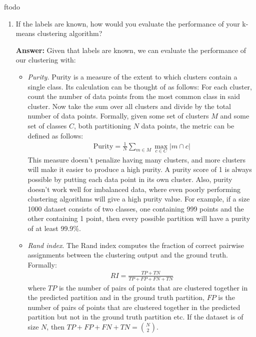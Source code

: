 ƒtodo\documentclass{article}
\newenvironment{QandA}{\begin{enumerate}[label=\arabic*.]}{\end{enumerate}}
\newenvironment{InnerQandA}{\begin{enumerate}[label=\roman*.]}{\end{enumerate}}
\newenvironment{answer}{\par\normalfont \textbf{Answer:}}{}
\begin{document}
\begin{QandA}
\begin{InnerQandA}
        \item If the labels are known, how would you evaluate the performance of your k-means clustering algorithm?
        \begin{answer}
            Given that labels are known, we can evaluate the performance of our clustering with:
            \begin{itemize}
                \item \textit{Purity.} Purity is a measure of the extent to which clusters contain a single class. Its calculation can be thought of as follows: For each cluster, count the number of data points from the most common class in said cluster. Now take the sum over all clusters and divide by the total number of data points. Formally, given some set of clusters $M$ and some set of classes $C$, both partitioning $N$ data points, the metric can be defined as follows:
                \begin{align*}
                    \text{Purity} = \frac{1}{N} \sum_{m \in M} \max_{c \in C} \vert m \cap c \vert
                \end{align*}
                This measure doesn't penalize having many clusters, and more clusters will make it easier to produce a high purity. A purity score of 1 is always possible by putting each data point in its own cluster. Also, purity doesn't work well for imbalanced data, where even poorly performing clustering algorithms will give a high purity value. For example, if a size 1000 dataset consists of two classes, one containing 999 points and the other containing 1 point, then every possible partition will have a purity of at least 99.9\%.
                \item \textit{Rand index}. The Rand index  computes the fraction of correct pairwise assignments between the clustering output and the ground truth. Formally:
                \begin{align*}
                    RI = \frac{TP + TN}{TP + FP + FN + TN}
                \end{align*}
                where $TP$ is the number of pairs of points that are clustered together in the predicted partition and in the ground truth partition, $FP$ is the number of pairs of points that are clustered together in the predicted partition but not in the ground truth partition etc. If the dataset is of size $N$, then $TP + FP + FN + TN = {N \choose 2}$.
            \end{itemize}
        \end{answer}


\end{InnerQandA}
\end{QandA}
\end{document}
